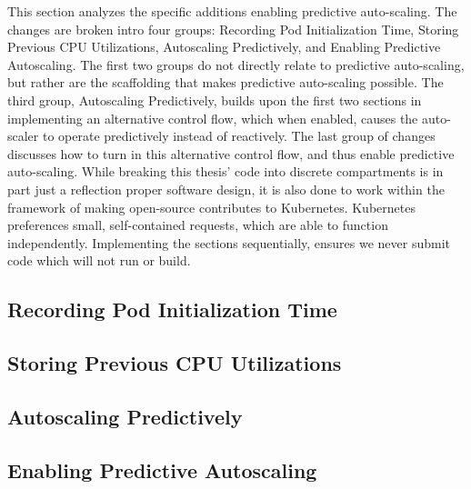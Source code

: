 This section analyzes the specific additions enabling predictive auto-scaling.
The changes are broken intro four groups: Recording Pod Initialization Time,
Storing Previous CPU Utilizations, Autoscaling Predictively, and Enabling
Predictive Autoscaling. The first two groups do not directly relate to
predictive auto-scaling, but rather are the scaffolding that makes predictive
auto-scaling possible. The third group, Autoscaling Predictively, builds upon
the first two sections in implementing an alternative control flow, which when
enabled, causes the auto-scaler to operate predictively instead of reactively.
The last group of changes discusses how to turn in this alternative control
flow, and thus enable predictive auto-scaling. While breaking this thesis' code
into discrete compartments is in part just a reflection proper software design,
it is also done to work within the framework of making open-source contributes
to Kubernetes. Kubernetes preferences small, self-contained requests, which are
able to function independently. Implementing the sections sequentially, ensures
we never submit code which will not run or build.

\subsection{Recording Pod Initialization Time}



\subsection{Storing Previous CPU Utilizations}



\subsection{Autoscaling Predictively}



\subsection{Enabling Predictive Autoscaling}


